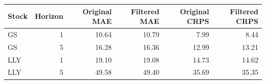 \begin{tabular}{lrrrrr}
\toprule
Stock & Horizon & Original MAE & Filtered MAE & Original CRPS & Filtered CRPS \\
\midrule
GS & 1 & 10.64 & 10.79 & 7.99 & 8.44 \\
GS & 5 & 16.28 & 16.36 & 12.99 & 13.21 \\
LLY & 1 & 19.10 & 19.08 & 14.73 & 14.62 \\
LLY & 5 & 49.58 & 49.40 & 35.69 & 35.35 \\
\bottomrule
\end{tabular}
